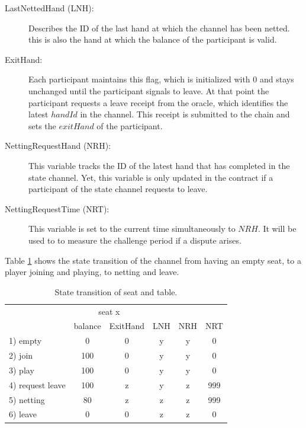 \begin{description}
\item[LastNettedHand (LNH):] Describes the ID of the last hand at which the channel has been netted. this is also the hand at which the balance of the participant is valid.
\item[ExitHand:] Each participant maintains this flag, which is initialized with 0 and stays unchanged until the participant signals to leave. At that point the participant requests a leave receipt from the oracle, which identifies the latest \(handId\) in the channel. This receipt is submitted to the chain and sets the \(exitHand\) of the participant.
\item[NettingRequestHand (NRH):] This variable tracks the ID of the latest hand that has completed in the state channel. Yet, this variable is only updated in the contract if a participant of the state channel requests to leave.
\item[NettingRequestTime (NRT):] This variable is set to the current time simultaneously to \(NRH\). It will be used to to measure the challenge period if a dispute arises.
\end{description}

Table \ref{fsm-table} shows the state transition of the channel from having an empty seat, to a player joining and playing, to netting and leave. 


\begin{table}[ht]
\centering
\caption{State transition of seat and table.}
\label{fsm-table}
\begin{tabular}{lccccc}
\hline
                 & \multicolumn{2}{c}{seat x} & \multicolumn{1}{l}{} & \multicolumn{1}{l}{} & \multicolumn{1}{l}{} \\ 
                 & balance     & ExitHand     & LNH                  & NRH                  & NRT                  \\ \hline
1) empty         & 0           & 0            & y                    & y                    & 0                    \\
2) join          & 100         & 0            & y                    & y                    & 0                    \\
3) play          & 100         & 0            & y                    & y                    & 0                    \\
4) request leave & 100         & z            & y                    & z                    & 999                  \\
5) netting       & 80          & z            & z                    & z                    & 999                  \\
6) leave         & 0           & 0            & z                    & z                    & 0                    \\ \hline
\end{tabular}
\end{table}

